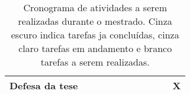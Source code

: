 \documentclass[portuguese,12pt,a4paper]{article}
\begin{document}
\begin{table}[H]
\begin{adjustbox}{width=1\textwidth}
\begin{tabular}{|l|cccc|ccccc|c|}
		Defesa da tese                 & \multicolumn{1}{c|}{}                          & \multicolumn{1}{c|}{}                          & \multicolumn{1}{c|}{}                          &                       & \multicolumn{1}{c|}{}                      & \multicolumn{1}{c|}{}                      & \multicolumn{1}{c|}{}                      & \multicolumn{1}{c|}{}                      &                       & X                     \\ \hline
	\end{tabular}

\end{adjustbox}
	\caption{Cronograma de atividades a serem realizadas durante o mestrado. Cinza escuro indica tarefas ja concluídas, cinza claro tarefas em andamento e branco tarefas a serem realizadas.}
\end{table}




\end{document}
